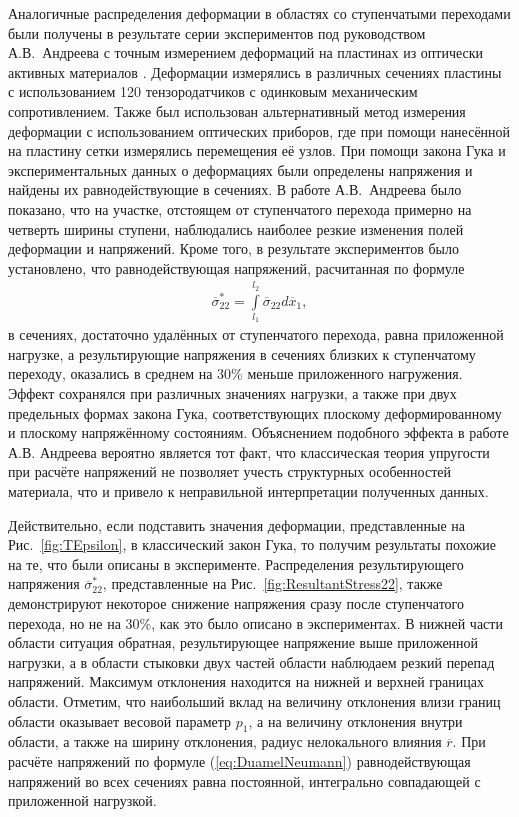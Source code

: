 Аналогичные распределения деформации в областях со ступенчатыми переходами были получены в результате серии экспериментов под руководством А.В.~Андреева с точным измерением деформаций на пластинах из оптически активных материалов \cite{Andreev}. Деформации измерялись в различных сечениях пластины с использованием 120 тензородатчиков с одинковым механическим сопротивлением. Также был использован альтернативный метод измерения деформации с использованием оптических приборов, где при помощи нанесённой на пластину сетки измерялись перемещения её узлов. При помощи закона Гука и экспериментальных данных о деформациях были определены напряжения и найдены их равнодействующие в сечениях. В работе А.В.~Андреева было показано, что на участке, отстоящем от ступенчатого перехода примерно на четверть ширины ступени, наблюдались наиболее резкие изменения полей деформации и напряжений. Кроме того, в результате экспериментов было установлено, что равнодействующая напряжений, расчитанная по формуле
\begin{gather*}
	\overline{\sigma}_{22}^* = \int\limits_{l_1}^{l_2} \overline{\sigma}_{22} d \overline{x}_1,
\end{gather*}
в сечениях, достаточно удалённых от ступенчатого перехода, равна приложенной нагрузке, а результирующие напряжения в сечениях близких к ступенчатому переходу, оказались в среднем на 30\% меньше приложенного нагружения. Эффект сохранялся при различных значениях нагрузки, а также при двух предельных формах закона Гука, соответствующих плоскому деформированному и плоскому напряжённому состояниям. Объяснением подобного эффекта в работе А.В. Андреева вероятно является тот факт, что классическая теория упругости при расчёте напряжений не позволяет учесть структурных особенностей материала, что и привело к неправильной интерпретации полученных данных.

Действительно, если подставить значения деформации, представленные на Рис.~\ref{fig:TEpsilon}, в классический закон Гука, то получим результаты похожие на те, что были описаны в эксперименте. Распределения результирующего напряжения $\overline{\sigma}_{22}^*$, представленные на Рис.~\ref{fig:ResultantStress22}, также демонстрируют некоторое снижение напряжения сразу после ступенчатого перехода, но не на 30\%, как это было описано в экспериментах. В нижней части области ситуация обратная, результирующее напряжение выше приложенной нагрузки, а в области стыковки двух частей области наблюдаем резкий перепад напряжений. Максимум отклонения находится на нижней и верхней границах области. Отметим, что наибольший вклад на величину отклонения влизи границ области оказывает весовой параметр $p_1$, а на величину отклонения внутри области, а также на ширину отклонения, радиус нелокального влияния $\overline{r}$. При расчёте напряжений по формуле (\ref{eq:DuamelNeumann}) равнодействующая напряжений во всех сечениях равна постоянной, интегрально совпадающей с приложенной нагрузкой.

